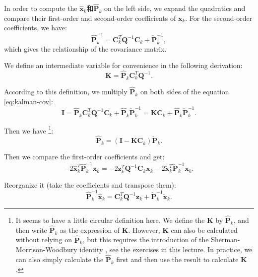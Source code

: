 In order to compute the $\hat{\mathbf{x}}_k$和$\mathbf{\hat{P}}_k$ on the left side, we expand the quadratics and compare their first-order and second-order coefficients of $\mathbf{x}_k$. For the second-order coefficients, we have: 
\begin{equation}
	\label{eq:kalman-cov}
	\hat{\mathbf{P}}_k^{ - 1} = \mathbf{C}_k^T{\mathbf{Q}^{ - 1}}{\mathbf{C}_k} + \check {\mathbf{P}}_k^{ - 1},
\end{equation}
which gives the relationship of the covariance matrix.

We define an intermediate variable for convenience in the following derivation:
\begin{equation}
	\label{eq:kalman-K}
	\mathbf{K} = \mathbf{\hat{P}}_k \mathbf{C}_k^T \mathbf{Q}^{-1}.
\end{equation}

According to this definition, we multiply $\mathbf{\hat{P}}_k$ on both sides of the equation \eqref{eq:kalman-cov}: 
\begin{equation}
	\mathbf{I} = \mathbf{\hat{P}}_k \mathbf{C}_k^T \mathbf{Q}^{-1} \mathbf{C}_k + \mathbf{\hat{P}}_k \mathbf{\check{P}}_k^{-1} = \mathbf{K} \mathbf{C}_k + \mathbf{\hat{P}}_k \mathbf{\check{P}}_k^{-1}.
\end{equation}

Then we have \footnote{It seems to have a little circular definition here. We define the $\mathbf{K}$ by $\mathbf{\hat{P}}_k$, and then write $\mathbf{\hat{P}}_k$ as the expression of $\mathbf{K}$. However, $\mathbf{K}$ can also be calculated without relying on $\mathbf{\hat{P}}_k$, but this requires the introduction of the Sherman-Morrison-Woodbury identity \cite{Sherman1950}, see the exercises in this lecture. In practice, we can also simply calculate the $\mathbf{\hat{P}}_k$ first and then use the result to calculate $\mathbf{K}$. }:
\begin{equation}
	\mathbf{\hat{P}}_k = ( \mathbf{I} - \mathbf{K} \mathbf{C}_k ) \mathbf{\check{P}}_k.
\end{equation}

Then we compare the first-order coefficients and get: 
\begin{equation}
	- 2\hat {\mathbf{x}}_k^T \hat{\mathbf{P}}_k^{ - 1}{\mathbf{x}_k} =  - 2\mathbf{z}_k^T {\mathbf{Q}^{ - 1}}{\mathbf{C}_k}{\mathbf{x}_k} - 2\mathbf{\check {x}}_k^T \mathbf{\check {P}}_k^{ - 1}{\mathbf{x}_k}.
\end{equation}

Reorganize it (take the coefficients and transpose them):
\begin{equation}
	\hat { \mathbf{P}}_k^{ - 1}{{\hat{\mathbf{x}}}_k} = \mathbf{C}_k^T {\mathbf{Q}^{ - 1}}{\mathbf{z}_k} + \check{\mathbf{P}}_k^{ - 1}{{\mathbf{\check{x}}}_k}.
\end{equation}

